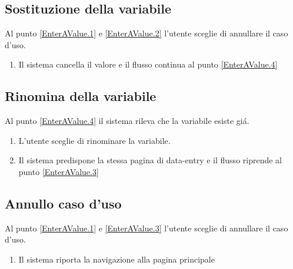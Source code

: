 \documentclass{article}
\begin{document}
  \subsection{Sostituzione della variabile}
  Al punto \ref{EnterAValue.1} e \ref{EnterAValue.2} l'utente sceglie di
  annullare il caso d'uso.
  \begin{enumerate}
    \item
      Il sistema cancella il valore e il flusso continua al punto \ref{EnterAValue.4}
  \end{enumerate}
  
  \subsection{Rinomina della variabile}
  Al punto \ref{EnterAValue.4} il sistema rileva che la variabile esiste gi\'a.
  \begin{enumerate}
    \item
      L'utente sceglie di rinominare la variabile.
    \item
      Il sistema predispone la stessa pagina di data-entry e il flusso riprende
      al punto \ref{EnterAValue.3}
  \end{enumerate}
  
  \subsection{Annullo caso d'uso}
  Al punto \ref{EnterAValue.1} e \ref{EnterAValue.3} l'utente sceglie di
  annullare il caso d'uso.
  \begin{enumerate}
    \item
      Il sistema riporta la navigazione alla pagina principale
  \end{enumerate}
  
\end{document}
